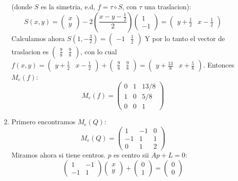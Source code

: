\documentclass{article}
\begin{document}
\begin{enumerate}[label=(\Alph*)]
\begin{enumerate}[label=\roman*)]
(donde $S$ es la simetria, e.d, $f = \tau \circ S$, con $\tau$ una traslacion):
\[
S(x,y) = \begin{pmatrix} x \\ y\end{pmatrix} - 2 \left( \frac{x-y-\frac{1}{2}}{2} \right)
\begin{pmatrix} 1 \\ -1\end{pmatrix} = \begin{pmatrix} y+\frac{1}{2} & x - \frac{1}{2}\end{pmatrix}
\]
Calculamos ahora $S\left(1, -\frac{3}{2}\right) = \begin{pmatrix} -1 & \frac{1}{2}\end{pmatrix}$
Y por lo tanto el vector de traslacion es $\begin{pmatrix} \frac{9}{8} & \frac{9}{8}\end{pmatrix}$, con
lo cual $f(x,y) = \begin{pmatrix} y + \frac{1}{2} & x - \frac{1}{2} \end{pmatrix} +
\begin{pmatrix} \frac{9}{8} & \frac{9}{8} \end{pmatrix} =
\begin{pmatrix} y + \frac{13}{8} & x + \frac{5}{8} \end{pmatrix}$. Entonces $M_e(f)$:
\[
M_e(f) = \begin{pmatrix} 0 & 1 & 13/8 \\ 1 & 0 & 5/8 \\ 0 & 0 & 1\end{pmatrix}
\]
\item Primero encontramos $M_e(Q)$:
\[
M_e(Q) = \begin{pmatrix} 1 & -1 & 0 \\ -1 & 1 & 1 \\ 0 & 1 & 2\end{pmatrix}
\]
Miramos ahora si tiene centros. $p$ es centro sii $Ap +L = 0$:
\[
\begin{pmatrix} 1 & -1 \\ -1 & 1 \end{pmatrix} \begin{pmatrix} x \\ y\end{pmatrix}
+ \begin{pmatrix} 0 \\ 1 \end{pmatrix} = \begin{pmatrix} 0 \\ 0\end{pmatrix}
\]
\end{enumerate}
\end{enumerate}
\end{document}
